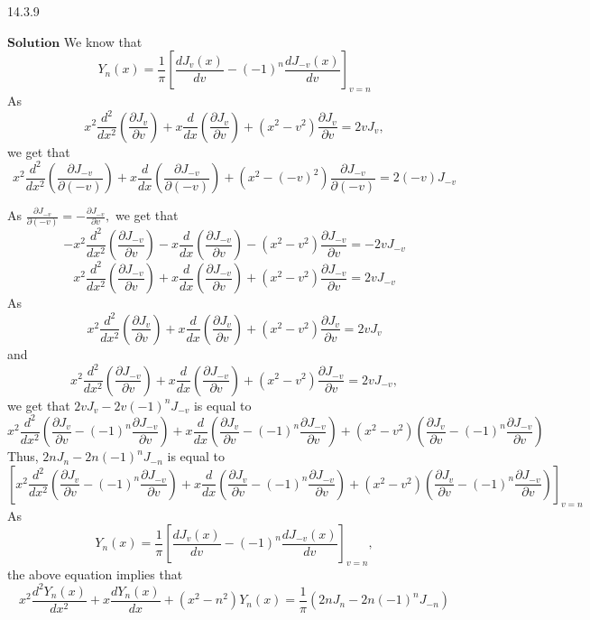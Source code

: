 \documentclass{article}
\begin{document}
\begin{flushleft}
\begin{mybox}{14.3.9}
\end{mybox}
$\boxed{\textbf{Solution}}$ We know that 
$$Y_{n}(x)=\frac{1}{\pi}\left[\frac{d J_{v}(x)}{d v}-(-1)^{n} \frac{d J_{-v}(x)}{d v}\right]_{v=n}$$
As 
$$x^{2} \frac{d^{2}}{d x^{2}}\left(\frac{\partial J_{v}}{\partial v}\right)+x \frac{d}{d x}\left(\frac{\partial J_{v}}{\partial v}\right)+\left(x^{2}-v^{2}\right) \frac{\partial J_{v}}{\partial v}=2 v J_{v},$$ 
we get that
$$x^{2} \frac{d^{2}}{d x^{2}}\left(\frac{\partial J_{-v}}{\partial(-v)}\right)+x \frac{d}{d x}\left(\frac{\partial J_{-v}}{\partial(-v)}\right)+\left(x^{2}-(-v)^{2}\right) \frac{\partial J_{-v}}{\partial(-v)}=2(-v) J_{-v}$$

As $\frac{\partial J_{-v}}{\partial(-v)}=-\frac{\partial J_{-v}}{\partial v},$ we get that 
$$-x^{2} \frac{d^{2}}{d x^{2}}\left(\frac{\partial J_{-v}}{\partial v}\right)-x \frac{d}{d x}\left(\frac{\partial J_{-v}}{\partial v}\right)-\left(x^{2}-v^{2}\right) \frac{\partial J_{-v}}{\partial v}=-2 v J_{-v}$$
$$x^{2} \frac{d^{2}}{d x^{2}}\left(\frac{\partial J_{-v}}{\partial v}\right)+x \frac{d}{d x}\left(\frac{\partial J_{-v}}{\partial v}\right)+\left(x^{2}-v^{2}\right) \frac{\partial J_{-v}}{\partial v}=2 v J_{-v}$$
As 
$$x^{2} \frac{d^{2}}{d x^{2}}\left(\frac{\partial J_{v}}{\partial v}\right)+x \frac{d}{d x}\left(\frac{\partial J_{v}}{\partial v}\right)+\left(x^{2}-v^{2}\right) \frac{\partial J_{v}}{\partial v}=2 v J_{v}$$ 
and
$$x^{2} \frac{d^{2}}{d x^{2}}\left(\frac{\partial J_{-v}}{\partial v}\right)+x \frac{d}{d x}\left(\frac{\partial J_{-v}}{\partial v}\right)+\left(x^{2}-v^{2}\right) \frac{\partial J_{-v}}{\partial v}=2 v J_{-v},$$ 
we get that $2 v J_{v}-2 v(-1)^{n} J_{-v}$ is equal to 
$$x^{2} \frac{d^{2}}{d x^{2}}\left(\frac{\partial J_{v}}{\partial v}-(-1)^{n} \frac{\partial J_{-v}}{\partial v}\right)+x \frac{d}{d x}\left(\frac{\partial J_{v}}{\partial v}-(-1)^{n} \frac{\partial J_{-v}}{\partial v}\right)+\left(x^{2}-v^{2}\right)\left(\frac{\partial J_{v}}{\partial v}-(-1)^{n} \frac{\partial J_{-v}}{\partial v}\right)$$
Thus, $2 n J_{n}-2 n(-1)^{n} J_{-n}$ is equal to
$$\left[x^{2} \frac{d^{2}}{d x^{2}}\left(\frac{\partial J_{v}}{\partial v}-(-1)^{n} \frac{\partial J_{-v}}{\partial v}\right)+x \frac{d}{d x}\left(\frac{\partial J_{v}}{\partial v}-(-1)^{n} \frac{\partial J_{-v}}{\partial v}\right)+\left(x^{2}-v^{2}\right)\left(\frac{\partial J_{v}}{\partial v}-(-1)^{n} \frac{\partial J_{-v}}{\partial v}\right)\right]_{v=n}$$
As 
$$Y_{n}(x)=\frac{1}{\pi}\left[\frac{d J_{v}(x)}{d v}-(-1)^{n} \frac{d J_{-v}(x)}{d v}\right]_{v=n},$$
the above equation implies that
$$x^{2} \frac{d^{2} Y_{n}(x)}{d x^{2}}+x \frac{d Y_{n}(x)}{d x}+\left(x^{2}-n^{2}\right) Y_{n}(x)=\frac{1}{\pi}\left(2 n J_{n}-2 n(-1)^{n} J_{-n}\right)$$

\end{flushleft}
\end{document}

